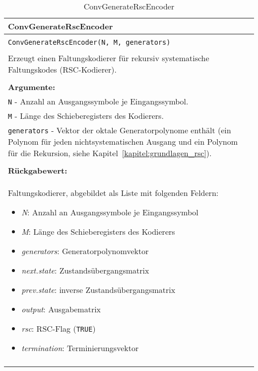 \begin{longtable}{|p{\textwidth}|}
\hline
\rowcolor{lightblue}
ConvGenerateRscEncoder
\\
\hline
\\
\texttt{ConvGenerateRscEncoder(N, M, generators)}\\
\\
Erzeugt einen Faltungskodierer für rekursiv systematische Faltungskodes (RSC-Kodierer).\\
\\
\textbf{Argumente:}\\
\texttt{N} - Anzahl an Ausgangssymbole je Eingangssymbol.\\
\texttt{M} - Länge des Schieberegisters des Kodierers.\\
\texttt{generators} - Vektor der oktale Generatorpolynome enthält (ein Polynom für jeden nichtsystematischen Ausgang und ein Polynom für die Rekursion, siehe Kapitel~\ref{kapitel:grundlagen_rsc}).\\
\\
\textbf{Rückgabewert:}\\
Faltungskodierer, abgebildet als Liste mit folgenden Feldern:
\vspace{-4mm}
\begin{itemize}
\renewcommand\labelitemi{--}
\itemsep-.5em %
\item \emph{N}: Anzahl an Ausgangssymbole je Eingangssymbol
\item \emph{M}: Länge des Schieberegisters des Kodierers
\item \emph{generators}: Generatorpolynomvektor
\item \emph{next.state}: Zustandsübergangsmatrix
\item \emph{prev.state}: inverse Zustandsübergangsmatrix
\item \emph{output}: Ausgabematrix
\item \emph{rsc}: RSC-Flag (\texttt{TRUE})
\item \emph{termination}: Terminierungsvektor
\end{itemize}
\\
\hline
\caption{ConvGenerateRscEncoder}
\label{funktion:ConvGenerateRscEncoder}
\end{longtable}